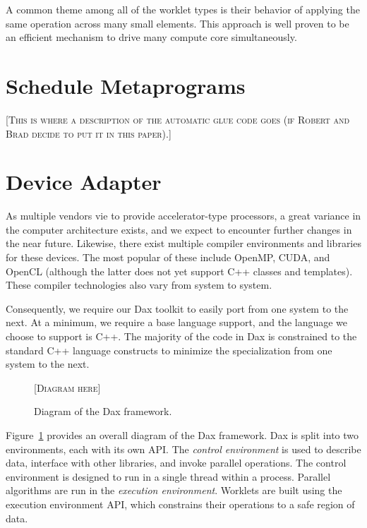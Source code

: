 \documentclass{sig-alternate}
\newcommand*{\keyterm}[1]{\emph{#1}}
\newcommand{\fix}[1]{{\color{red}\textsc{[#1]}}}
\begin{document}
A common theme among all of the worklet types is their behavior of applying
the same operation across many small elements.  This approach is well
proven to be an efficient mechanism to drive many compute core
simultaneously.

\section{Schedule Metaprograms}
\label{sec:ScheduleMetaprograms}

\noindent
\fix{This is where a description of the automatic glue code goes (if Robert
  and Brad decide to put it in this paper).}

\section{Device Adapter}
\label{sec:DeviceAdapter}

\noindent
As multiple vendors vie to provide accelerator-type processors, a great
variance in the computer architecture exists, and we expect to encounter
further changes in the near future.  Likewise, there exist multiple
compiler environments and libraries for these devices.  The most popular of
these include OpenMP, CUDA, and OpenCL (although the latter does not yet
support C++ classes and templates).  These compiler technologies also vary
from system to system.

Consequently, we require our Dax toolkit to easily port from one system to
the next.  At a minimum, we require a base language support, and the
language we choose to support is C++.  The majority of the code in Dax is
constrained to the standard C++ language constructs to minimize the
specialization from one system to the next.

\begin{figure}[htb]
  \centering
  \fix{Diagram here}
  \caption{Diagram of the Dax framework.}
  \label{fig:DaxDiagram}
\end{figure}

Figure~\ref{fig:DaxDiagram} provides an overall diagram of the Dax
framework.  Dax is split into two environments, each with its own API.  The
\keyterm{control environment} is used to describe data, interface with
other libraries, and invoke parallel operations.  The control environment
is designed to run in a single thread within a process.  Parallel
algorithms are run in the \keyterm{execution environment}.  Worklets are
built using the execution environment API, which constrains their
operations to a safe region of data.
\end{document}
